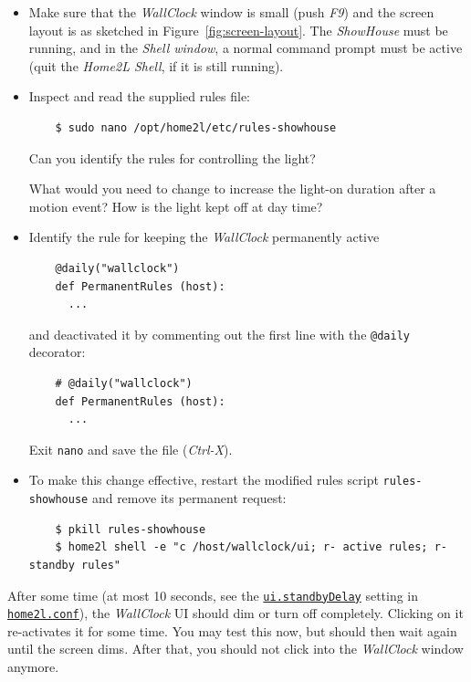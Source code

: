 \documentclass[12pt,english,parskip=half]{scrreprt}
\newcommand{\idx}[1]{#1\index{#1}}
\newcommand{\envref}[1]{\hyperref[env:#1]{\texttt{#1}}}        %
\newcommand{\toolref}[1]{\hyperref[tool:#1]{\texttt{\idx{#1}}}}
\begin{document}
\begin{itemize}[$\blacktriangleright$]

\item
  Make sure that the \emph{WallClock} window is small (push \emph{F9})
  and the screen layout is as sketched in Figure~\ref{fig:screen-layout}.
  The \emph{ShowHouse} must be running, and in the
  \emph{Shell window}, a normal command prompt must be active (quit the
  \emph{Home2L Shell}, if it is still running).

\item
  Inspect and read the supplied rules file:
  \begin{lstlisting}
    $ sudo nano /opt/home2l/etc/rules-showhouse
  \end{lstlisting}

  Can you identify the rules for controlling the light?

  What would you need to change to increase the light-on duration after a motion event?
  How is the light kept off at day time?

\item
  Identify the rule for keeping the \emph{WallClock} permanently active
  \begin{lstlisting}
    @daily("wallclock")
    def PermanentRules (host):
      ...
  \end{lstlisting}
  and deactivated it by commenting out the first line with the
  \texttt{@daily} decorator:
  \begin{lstlisting}
    # @daily("wallclock")
    def PermanentRules (host):
      ...
  \end{lstlisting}
  Exit \texttt{nano} and save the file (\emph{Ctrl-X}).

\item
  To make this change effective, restart the modified rules script
  \texttt{rules-showhouse} and remove its permanent request:
  \begin{lstlisting}
    $ pkill rules-showhouse
    $ home2l shell -e "c /host/wallclock/ui; r- active rules; r- standby rules"
  \end{lstlisting}

\end{itemize}

After some time (at most 10 seconds, see the \envref{ui.standbyDelay} setting in
\toolref{home2l.conf}), the \emph{WallClock} UI should dim or turn off
completely. Clicking on it re-activates it for some time. You may test
this now, but should then wait again until the screen dims. After that,
you should not click into the \emph{WallClock} window anymore.
\end{document}
